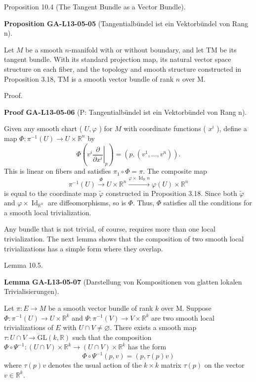 \documentclass[10pt, letterpaper]{article}
\newcommand{\CustomHeading}[3]{%
  \par\medskip\noindent%
  \textbf{#1 #2} \textnormal{(#3)}.\enskip%
}
\newenvironment{PROP}[2]{\begin{unitbox}\CustomHeading{Proposition}{#1}{#2}}{\end{unitbox}}
\newenvironment{LEM}[2]{\begin{unitbox}\CustomHeading{Lemma}{#1}{#2}}{\end{unitbox}}
\newenvironment{PROOF}[2]{\begin{unitbox}\CustomHeading{Proof}{#1}{#2}}{\end{unitbox}}
\begin{document}
Proposition 10.4 (The Tangent Bundle as a Vector Bundle). 


\begin{PROP}{GA-L13-05-05}{Tangentialbündel ist ein Vektorbündel von Rang n}
Let $M$ be a smooth $n$-manifold with or without boundary, and let TM be its tangent bundle. With its standard projection map, its natural vector space structure on each fiber, and the topology and smooth structure constructed in Proposition 3.18, TM is a smooth vector bundle of rank $n$ over M.
\end{PROP}


Proof. 

\begin{PROOF}{GA-L13-05-06}{P: Tangentialbündel ist ein Vektorbündel von Rang n}
Given any smooth chart ( $U, \varphi$ ) for $M$ with coordinate functions ( $x^i$ ), define a map $\Phi: \pi^{-1}(U) \rightarrow U \times \mathbb{R}^n$ by
$$
\Phi\left(\left.v^i \frac{\partial}{\partial x^i}\right|_p\right)=\left(p,\left(v^1, \ldots, v^n\right)\right) .
$$
This is linear on fibers and satisfies $\pi_1 \circ \Phi=\pi$. The composite map
$$
\pi^{-1}(U) \xrightarrow{\Phi} U \times \mathbb{R}^n \xrightarrow{\varphi \times \operatorname{Id}_{\mathbb{R}} n} \varphi(U) \times \mathbb{R}^n
$$
is equal to the coordinate map $\tilde{\varphi}$ constructed in Proposition 3.18. Since both $\tilde{\varphi}$ and $\varphi \times \operatorname{Id}_{\mathbb{R}^n}$ are diffeomorphisms, so is $\Phi$. Thus, $\Phi$ satisfies all the conditions for a smooth local trivialization.
\end{PROOF}



Any bundle that is not trivial, of course, requires more than one local trivialization. The next lemma shows that the composition of two smooth local trivializations has a simple form where they overlap.

Lemma 10.5. 


\begin{LEM}{GA-L13-05-07}{Darstellung von Kompositionen von glatten lokalen Trivialisierungen}
Let $\pi: E \rightarrow M$ be a smooth vector bundle of rank $k$ over M. Suppose $\Phi: \pi^{-1}(U) \rightarrow U \times \mathbb{R}^k$ and $\Psi: \pi^{-1}(V) \rightarrow V \times \mathbb{R}^k$ are two smooth local trivializations of $E$ with $U \cap V \neq \varnothing$. There exists a smooth map $\tau: U \cap V \rightarrow \mathrm{GL}(k, \mathbb{R})$ such that the composition $\Phi \circ \Psi^{-1}:(U \cap V) \times \mathbb{R}^k \rightarrow(U \cap V) \times \mathbb{R}^k$ has the form
$$
\Phi \circ \Psi^{-1}(p, v)=(p, \tau(p) v)
$$
where $\tau(p) v$ denotes the usual action of the $k \times k$ matrix $\tau(p)$ on the vector $v \in \mathbb{R}^k$.
\end{LEM}
\end{document}
